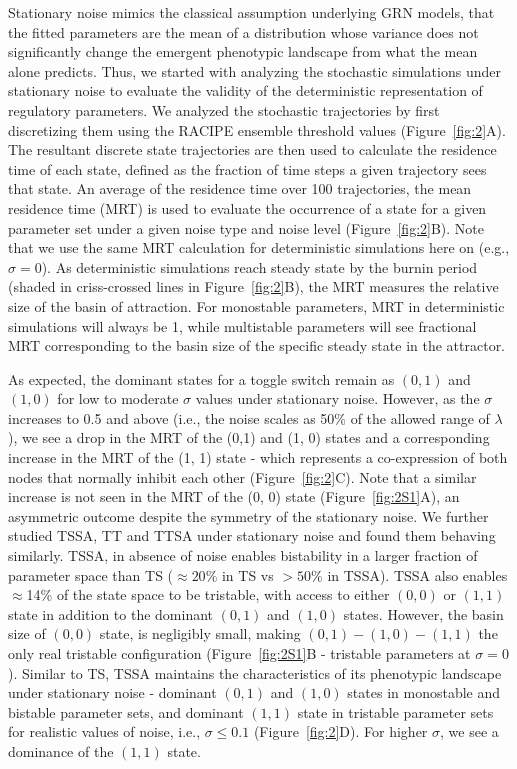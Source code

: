 \documentclass[11pt]{article}
\begin{document}
Stationary noise mimics the classical assumption underlying GRN models, that the fitted parameters are the mean of a distribution whose variance does not significantly change the emergent phenotypic landscape from what the mean alone predicts. Thus, we started with analyzing the stochastic simulations under stationary noise to evaluate the validity of the deterministic representation of regulatory parameters. We analyzed the stochastic trajectories by first discretizing them using the RACIPE ensemble threshold values (Figure~\ref{fig:2}A). The resultant discrete state trajectories are then used to calculate the residence time of each state, defined as the fraction of time steps a given trajectory sees that state. An average of the residence time over 100 trajectories, the mean residence time (MRT) is used to evaluate the occurrence of a state for a given parameter set under a given noise type and noise level (Figure~\ref{fig:2}B). Note that we use the same MRT calculation for deterministic simulations here on (e.g., $\sigma = 0$). As deterministic simulations reach steady state by the burnin period (shaded in criss-crossed lines in Figure~\ref{fig:2}B), the MRT measures the relative size of the basin of attraction. For monostable parameters, MRT in deterministic simulations will always be 1, while multistable parameters will see fractional MRT corresponding to the basin size of the specific steady state in the attractor. 

As expected, the dominant states for a toggle switch remain as $(0, 1)$ and $(1, 0)$ for low to moderate $\sigma$ values under stationary noise. However, as the $\sigma$ increases to 0.5 and above (i.e., the noise scales as 50\% of the allowed range of $\lambda$), we see a drop in the MRT of the (0,1) and (1, 0) states and a corresponding increase in the MRT of the (1, 1) state - which represents a co-expression of both nodes that normally inhibit each other (Figure~\ref{fig:2}C). Note that a similar increase is not seen in the MRT of the (0, 0) state (Figure~\ref{fig:2S1}A), an asymmetric outcome despite the symmetry of the stationary noise. We further studied TSSA, TT and TTSA under stationary noise and found them behaving similarly. TSSA, in absence of noise enables bistability in a larger fraction of parameter space than TS ($\approx 20\%$ in TS vs $>50\%$ in TSSA). TSSA also enables $\approx$14\% of the state space to be tristable, with access to either $(0, 0)$ or $(1, 1)$ state in addition to the dominant $(0, 1)$ and $(1, 0)$ states. However, the basin size of $(0, 0)$ state, is negligibly small, making $(0, 1) - (1, 0)-(1, 1)$ the only real tristable configuration (Figure~\ref{fig:2S1}B - tristable parameters at $\sigma = 0$). Similar to TS, TSSA maintains the characteristics of its phenotypic landscape under stationary noise - dominant $(0,1)$ and $(1,0)$ states in monostable and bistable parameter sets, and dominant $(1, 1)$ state in tristable parameter sets for realistic values of noise, i.e., $\sigma \leq 0.1$ (Figure~\ref{fig:2}D). For higher $\sigma$, we see a dominance of the $(1, 1)$ state. 
\end{document}
